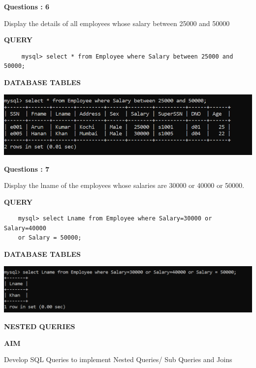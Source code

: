 \documentclass[a4paper,12pt]{report}
\begin{document}
\begin{flushleft}
    \textbf{Questions : 6}
\end{flushleft}
Display the details of all employees whose salary between 25000 and 50000
	\begin{flushleft}
		\textbf{QUERY }
	\end{flushleft}
 \begin{verbatim}
     mysql> select * from Employee where Salary between 25000 and 50000;
 \end{verbatim}
\begin{flushleft}
		\textbf{DATABASE TABLES} 
\end{flushleft} 

\includegraphics[scale=1]{sal.png}

\begin{flushleft}
    \textbf{Questions : 7}
\end{flushleft}
Display the lname of the employees whose salaries are 30000 or 40000 or 50000.
	\begin{flushleft}
		\textbf{QUERY }
	\end{flushleft}
 \begin{verbatim}
    mysql> select Lname from Employee where Salary=30000 or Salary=40000
    or Salary = 50000; 
 \end{verbatim}
\begin{flushleft}
		\textbf{DATABASE TABLES} 
\end{flushleft} 

\includegraphics[scale=0.9]{sal2.png}

\newpage
\begin{center}
		\large\textbf{NESTED QUERIES}
	\end{center}
	
	\begin{flushleft}
		\textbf{AIM }
	\end{flushleft} 
	   Develop SQL Queries to implement Nested Queries/ Sub Queries and Joins
\end{document}
